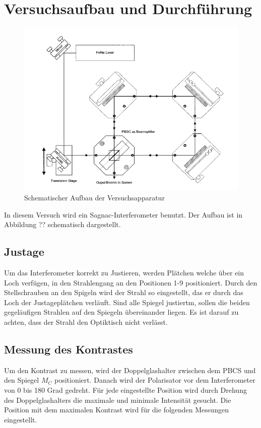 \section{Versuchsaufbau und Durchführung}

\begin{figure}[h]
\centering
\includegraphics[scale=0.8]{img/aufbau.PNG}
\caption{Schematischer Aufbau der Versuchsapparatur \cite{FP}}
\label{aufbau}
\end{figure}


In diesem Versuch wird ein Sagnac-Interferometer benutzt. Der Aufbau ist in Abbildung ?? schematisch dargestellt.

\subsection{Justage}
Um das Interferometer korrekt zu Justieren, werden Plätchen welche über ein Loch verfügen, in den Strahlengang an den Positionen 1-9 positioniert. Durch den Stellschrauben an den Spigeln wird der Strahl
so eingestellt, das er durch das Loch der Justageplätchen verläuft. Sind alle Spiegel justiertm, sollen die beiden gegeläufigen Strahlen auf den Spiegeln übereinander liegen.
Es ist darauf zu achten, dass der Strahl den Optiktisch nicht verlässt.


\subsection{Messung des Kontrastes}
Um den Kontrast zu messen, wird der Doppelglashalter zwischen dem PBCS und den Spiegel $M_C$ positioniert. Danach wird der Polarisator vor dem Interferometer
von 0 bis 180 Grad gedreht. Für jede eingestellte Position wird durch Drehung des Doppelglashalters die maximale und minimale Intensität gesucht.
Die Position mit dem maximalen Kontrast wird für die folgenden Messungen eingestellt.

